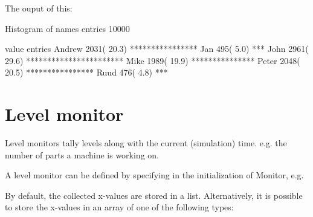 \documentclass[letterpaper,10pt,english]{sphinxmanual}
\begin{document}
The ouput of this:

%
\begin{sphinxVerbatim}[commandchars=\\\{\}]
Histogram of names
entries          10000

value               entries
Andrew                 2031( 20.3\PYGZpc{}) ****************
Jan                     495(  5.0\PYGZpc{}) ***
John                   2961( 29.6\PYGZpc{}) ***********************
Mike                   1989( 19.9\PYGZpc{}) ***************
Peter                  2048( 20.5\PYGZpc{}) ****************
Ruud                    476(  4.8\PYGZpc{}) ***
\end{sphinxVerbatim}


\section{Level monitor}
\label{\detokenize{Monitor:level-monitor}}
Level monitors tally levels along with the current (simulation) time.
e.g. the number of parts a machine is working on.

A level monitor can be defined by specifying  in the initialization of Monitor, e.g.

%
\begin{sphinxVerbatim}[commandchars=\\\{\}]
    
\end{sphinxVerbatim}

By default, the collected x-values are stored in a list. Alternatively, it is possible to store
the x-values in an array of one of the following types:
\end{document}
